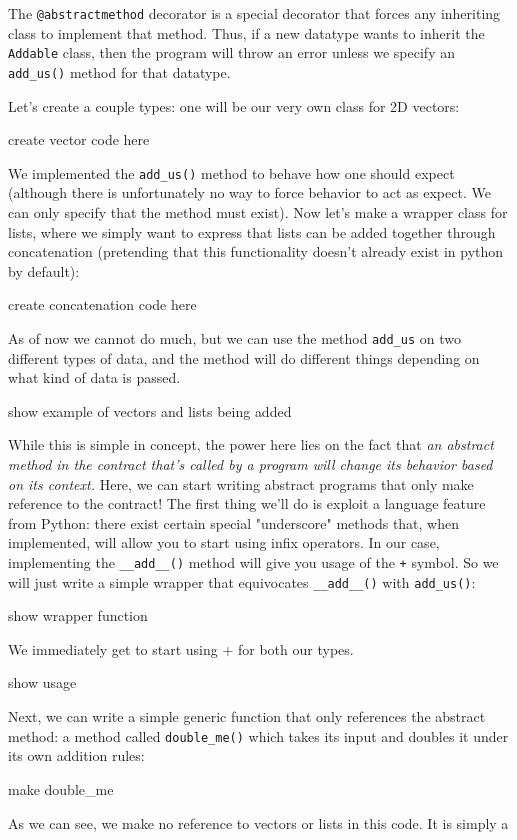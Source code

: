 \documentclass[letterpaper, 10 pt, conference]{ieeeconf}  %
\begin{document}
The \texttt{@abstractmethod} decorator is a special decorator that forces any inheriting class to implement that method.
Thus, if a new datatype wants to inherit the \texttt{Addable} class, then the program will throw an error unless we specify an \texttt{add\_us()} method for that datatype.

Let's create a couple types: one will be our very own class for 2D vectors:

create vector code here

We implemented the \texttt{add\_us()} method to behave how one should expect (although there is unfortunately no way to force behavior to act as expect. We can only specify that the method must exist).
Now let's make a wrapper class for lists, where we simply want to express that lists can be added together through concatenation (pretending that this functionality doesn't already exist in python by default):

create concatenation code here

As of now we cannot do much, but we can use the method \texttt{add\_us} on two different types of data, and the method will do different things depending on what kind of data is passed.

show example of vectors and lists being added

While this is simple in concept, the power here lies on the fact that \emph{an abstract method in the contract that's called by a program will change its behavior based on its context.}
Here, we can start writing abstract programs that only make reference to the contract!
The first thing we'll do is exploit a language feature from Python: there exist certain special "underscore" methods that, when implemented, will allow you to start using infix operators.
In our case, implementing the \texttt{\_\_add\_\_()} method will give you usage of the \texttt{+} symbol.
So we will just write a simple wrapper that equivocates \texttt{\_\_add\_\_()} with \texttt{add\_us()}:

show wrapper function

We immediately get to start using + for both our types.

show usage

Next, we can write a simple generic function that only references the abstract method: a method called \texttt{double\_me()} which takes its input and doubles it under its own addition rules:

make double\_me

As we can see, we make no reference to vectors or lists in this code.
It is simply a 
\end{document}
